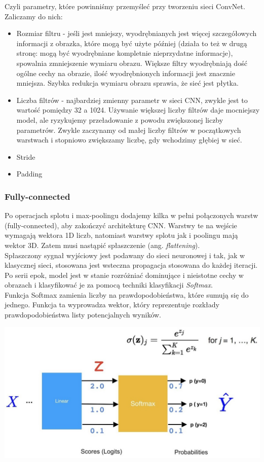 \documentclass[12pt,a4paper]{article}
\begin{document}
    Czyli parametry, które powinniśmy przemyśleć przy tworzeniu sieci ConvNet. Zaliczamy do nich:
    \begin{itemize}
        \item Rozmiar filtru - jeśli jest mniejszy, wyodrębnianych jest więcej szczegółowych informacji z obrazka, które mogą być użyte później (działa to też w drugą stronę: mogą być wyodrębniane kompletnie nieprzydatne informacje), spowalnia zmniejszenie wymiaru obrazu. Większe filtry wyodrębniają dość ogólne cechy na obrazie, ilość wyodrębnionych informacji jest znacznie mniejsza. Szybka redukcja wymiaru obrazu sprawia, że sieć jest płytka.
        \item Liczba filtrów - najbardziej zmienny parametr w sieci CNN, zwykle jest to wartość pomiędzy 32 a 1024. Używanie większej liczby filtrów daje mocniejszy model, ale ryzykujemy przeładowanie z powodu zwiększonej liczby parametrów. Zwykle zaczynamy od małej liczby filtrów w początkowych warstwach i stopniowo zwiększamy liczbę, gdy wchodzimy głębiej w sieć.
        \item Stride
        \item Padding
    \end{itemize}
    \subsubsection{Fully-connected}
    
        Po operacjach splotu i max-poolingu dodajemy kilka w pełni połączonych warstw (fully-connected), aby zakończyć architekturę CNN. Warstwy te na wejście wymagają wektora 1D liczb, natomiast warstwy splotu jak i poolingu mają wektor 3D. Zatem musi nastąpić spłaszczenie (ang. \textit{flattening}).
        \\
        
        Spłaszczony sygnał wyjściowy jest podawany do sieci neuronowej i tak, jak w klasycznej sieci, stosowana jest wsteczna propagacja stosowana do każdej iteracji. Po serii epok, model jest w stanie rozróżniać dominujące i  nieistotne cechy w obrazach i klasyfikować je za pomocą techniki klasyfikacji \textit{Softmax}.
        \\
        
        Funkcja Softmax zamienia liczby na prawdopodobieństwa, które sumują się do jednego. Funkcja ta wyprowadza wektor, który reprezentuje rozkłady prawdopodobieństwa listy potencjalnych wyników.
        
        \begin{center}
            \includegraphics[scale=0.45]{softmax.png}
        \end{center}
\end{document}
